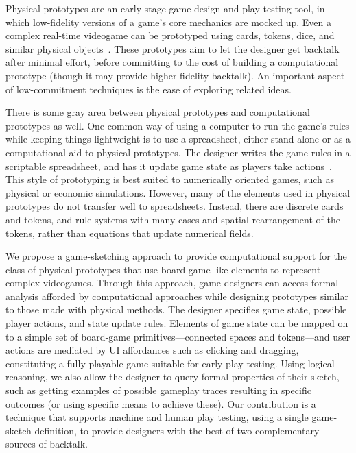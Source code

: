 \documentclass[letterpaper]{article}
\begin{document}
Physical prototypes are an early-stage game design and play testing tool, in
which low-fidelity versions of a game's core mechanics are mocked up. Even a
complex real-time videogame can be prototyped using cards, tokens, dice, and
similar physical objects~\cite[ch.\ 7]{Sigman:Gamasutra,Fullerton}. These
prototypes aim to let the designer get backtalk after minimal effort, before
committing to the cost of building a computational prototype (though it may provide
higher-fidelity backtalk). An important aspect of low-commitment techniques is
the ease of exploring related ideas.

There is some gray area between physical prototypes and computational
prototypes as well. One common way of using a computer to run the game's rules
while keeping things lightweight is to use a spreadsheet, either stand-alone or
as a computational aid to physical prototypes. The designer writes the game
rules in a scriptable spreadsheet, and has it update game state as players take
actions~\cite[pp.\ 216, 221, 246]{Fullerton}.  This style of prototyping is
best suited to numerically oriented games, such as physical or economic simulations.
However, many of the elements used in physical prototypes do not
transfer well to spreadsheets. Instead, there are discrete cards and
tokens, and rule systems with many cases and spatial rearrangement of the
tokens, rather than equations that update numerical fields.

We propose a game-sketching approach to provide computational support for the
class of physical prototypes that use board-game like elements to
represent complex videogames. Through this approach, game designers
can access formal analysis afforded by computational approaches while designing
prototypes similar to those made with physical methods. The designer specifies
game state, possible player actions, and state update rules.  Elements of game
state can be mapped on to a simple set of board-game primitives---connected
spaces and tokens---and user actions are mediated by UI affordances such as
clicking and dragging, constituting a fully playable game suitable for early play testing.
Using logical reasoning, we also allow the designer to query formal
properties of their sketch, such as getting examples of possible gameplay
traces resulting in specific outcomes (or using specific means to achieve
these). Our contribution is a technique that supports machine and human play
testing, using a single game-sketch definition, to provide designers with the
best of two complementary sources of backtalk. 
\end{document}
